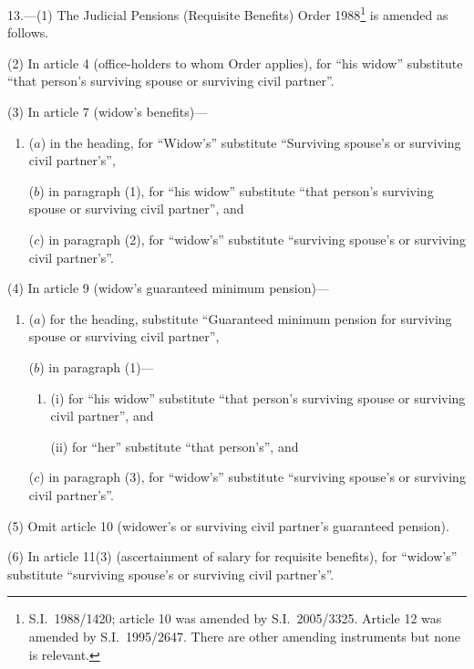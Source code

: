 \documentclass[12pt,a4paper]{article}
\begin{document}
13.—(1) The Judicial Pensions (Requisite Benefits) Order 1988\footnote{S.I.\ 1988/1420; article 10 was amended by S.I.~2005/3325. Article 12 was amended by S.I.~1995/2647. There are other amending instruments but none is relevant.} is amended as follows.

(2) In article 4 (office-holders to whom Order applies), for “his widow” substitute “that person’s surviving spouse or surviving civil partner”.

(3) In article 7 (widow’s benefits)—
\begin{enumerate}\item[]
($a$) in the heading, for “Widow’s” substitute “Surviving spouse’s or surviving civil partner’s”,

($b$) in paragraph (1), for “his widow” substitute “that person’s surviving spouse or surviving civil partner”, and

($c$) in paragraph (2), for “widow’s” substitute “surviving spouse’s or surviving civil partner’s”.
\end{enumerate}

(4) In article 9 (widow’s guaranteed minimum pension)—
\begin{enumerate}\item[]
($a$) for the heading, substitute “Guaranteed minimum pension for surviving spouse or surviving civil partner”,

($b$) in paragraph (1)—
\begin{enumerate}\item[]
(i) for “his widow” substitute “that person’s surviving spouse or surviving civil partner”, and

(ii) for “her” substitute “that person’s”, and
\end{enumerate}

($c$) in paragraph (3), for “widow’s” substitute “surviving spouse’s or surviving civil partner’s”.
\end{enumerate}

(5) Omit article 10 (widower’s or surviving civil partner’s guaranteed pension).

(6) In article 11(3) (ascertainment of salary for requisite benefits), for “widow’s” substitute “surviving spouse’s or surviving civil partner’s”.
\end{document}
